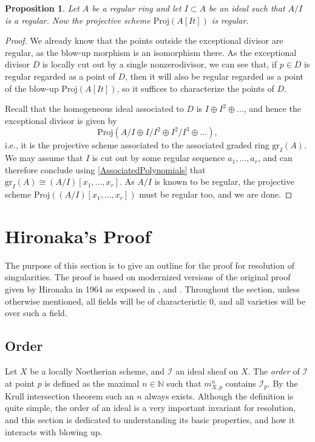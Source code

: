 \documentclass[12pt,a4paper,leqno]{article}
\newcommand{\N}{\mathbb{N}}
\newcommand{\gr}{\mathrm{gr}}
\newcommand{\proj}{\mathrm{Proj}}
\newcommand{\fref}[1]{\hyperref[{#1}]{\ref*{#1}}}
\theoremstyle{plain}
\newtheorem{prop}[theo]{Proposition}
\theoremstyle{definition}
\theoremstyle{remark}
\begin{document}
\begin{prop}
Let $A$ be a regular ring and let $I \subset A$ be an ideal such that $A/I$ is a regular. Now the projective scheme $\proj (A[It])$ is regular. 
\end{prop}
\begin{proof}
We already know that the points outside the exceptional divisor are regular, as the blow-up morphism is an isomorphism there. As the exceptional divisor $D$ is locally cut out by a single nonzerodivisor, we can see that, if $p \in D$ is regular regarded as a point of $D$, then it will also be regular regarded as a point of the blow-up $\proj (A[It])$, so it suffices to characterize the points of $D$.

Recall that the homogeneous ideal associated to $D$ is $I \oplus I^2 \oplus ...$, and hence the exceptional divisor is given by
\begin{equation*}
\proj (A/I \oplus I/I^2 \oplus I^2 / I^3 \oplus ...), 
\end{equation*}
i.e., it is the projective scheme associated to the associated graded ring $\gr_I (A)$. We may assume that $I$ is cut out by some regular sequence $a_1,...,a_r$, and can therefore conclude using \fref{AssociatedPolynomials} that $\gr_I (A) \cong (A/I)[x_1,...,x_r]$. As $A/I$ is known to be regular, the projective scheme $\proj ((A/I)[x_1,...,x_r])$ must be regular too, and we are done.
\end{proof}

\section{Hironaka's Proof}\label{HirRes}

The purpose of this section is to give an outline for the proof for resolution of singularities. The proof is based on modernized versions of the original proof given by Hironaka in 1964 as exposed in \cite{Cut}, \cite{Hau} and \cite{Kol}. Throughout the section, unless otherwise mentioned, all fields will be of characteristic 0, and all varieties will be over such a field. 

\subsection{Order}

Let $X$ be a locally Noetherian scheme, and $\mathscr{I}$ an ideal sheaf on $X$. The \emph{order} of $\mathscr{I}$ at point $p$ is defined as the maximal $n \in \N$ such that $m_{X,p}^n$ contains $\mathscr{I}_p$. By the Krull intersection theorem such an $n$ always exists. Although the definition is quite simple, the order of an ideal is a very important invariant for resolution, and this section is dedicated to understanding its basic properties, and how it interacts with blowing up.
\end{document}

